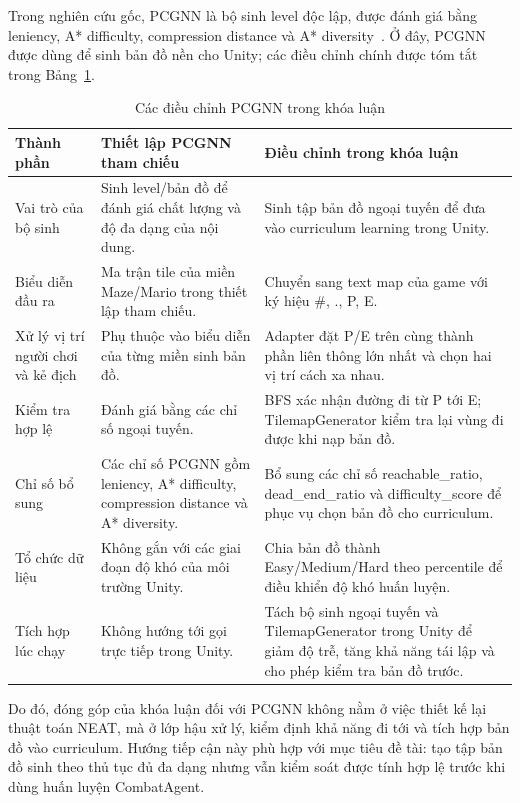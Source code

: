 Trong nghiên cứu gốc, PCGNN là bộ sinh level độc lập, được đánh giá bằng leniency, A* difficulty, compression distance và A* diversity~\cite{Beukman2022}. Ở đây, PCGNN được dùng để sinh bản đồ nền cho Unity; các điều chỉnh chính được tóm tắt trong Bảng~\ref{tab:pcgnn_improvements}.
\begin{table}[H]
    \centering
    \small
    \caption{Các điều chỉnh PCGNN trong khóa luận}
    \label{tab:pcgnn_improvements}
    \begin{tabular}{p{4.0cm} p{5.0cm} p{5.0cm}}
        \toprule
        \textbf{Thành phần} & \textbf{Thiết lập PCGNN tham chiếu} & \textbf{Điều chỉnh trong khóa luận} \\
        \midrule
        Vai trò của bộ sinh & Sinh level/bản đồ để đánh giá chất lượng và độ đa dạng của nội dung. & Sinh tập bản đồ ngoại tuyến để đưa vào curriculum learning trong Unity. \\
        Biểu diễn đầu ra & Ma trận tile của miền Maze/Mario trong thiết lập tham chiếu. & Chuyển sang text map của game với ký hiệu \#, ., P, E. \\
        Xử lý vị trí người chơi và kẻ địch & Phụ thuộc vào biểu diễn của từng miền sinh bản đồ. & Adapter đặt P/E trên cùng thành phần liên thông lớn nhất và chọn hai vị trí cách xa nhau. \\
        Kiểm tra hợp lệ & Đánh giá bằng các chỉ số ngoại tuyến. & BFS xác nhận đường đi từ P tới E; TilemapGenerator kiểm tra lại vùng đi được khi nạp bản đồ. \\
        Chỉ số bổ sung & Các chỉ số PCGNN gồm leniency, A* difficulty, compression distance và A* diversity. & Bổ sung các chỉ số reachable\_ratio, dead\_end\_ratio và difficulty\_score để phục vụ chọn bản đồ cho curriculum. \\
        Tổ chức dữ liệu & Không gắn với các giai đoạn độ khó của môi trường Unity. & Chia bản đồ thành Easy/Medium/Hard theo percentile để điều khiển độ khó huấn luyện. \\
        Tích hợp lúc chạy & Không hướng tới gọi trực tiếp trong Unity. & Tách bộ sinh ngoại tuyến và TilemapGenerator trong Unity để giảm độ trễ, tăng khả năng tái lập và cho phép kiểm tra bản đồ trước. \\
        \bottomrule
    \end{tabular}
\end{table}

Do đó, đóng góp của khóa luận đối với PCGNN không nằm ở việc thiết kế lại thuật toán NEAT, mà ở lớp hậu xử lý, kiểm định khả năng đi tới và tích hợp bản đồ vào curriculum. Hướng tiếp cận này phù hợp với mục tiêu đề tài: tạo tập bản đồ sinh theo thủ tục đủ đa dạng nhưng vẫn kiểm soát được tính hợp lệ trước khi dùng huấn luyện CombatAgent.

